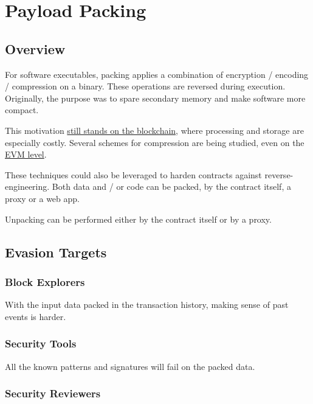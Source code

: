\section{Payload Packing} \label{sec:packing}

\subsection{Overview}

For software executables, packing applies a combination of encryption / encoding / compression on a binary.
These operations are reversed during execution. Originally, the purpose was to spare secondary memory and make software more compact.

This motivation \href{https://medium.com/joyso/solidity-compress-input-in-smart-contract-d9a0eee30fe0}{still stands on the blockchain}, where processing and storage are especially costly.
Several schemes for compression are being studied, even on the \href{https://eips.ethereum.org/EIPS/eip-3772}{EVM level}.

These techniques could also be leveraged to harden contracts against reverse-engineering.
Both data and / or code can be packed, by the contract itself, a proxy or a web app.

Unpacking can be performed either by the contract itself or by a proxy.

\subsection{Evasion Targets}

\subsubsection{Block Explorers}

With the input data packed in the transaction history, making sense of past events is harder.

\subsubsection{Security Tools}

All the known patterns and signatures will fail on the packed data.

\subsubsection{Security Reviewers}

